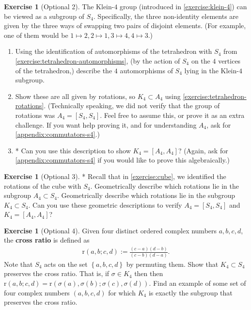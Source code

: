 \documentclass[reqno, 12pt, letter]{article}
\theoremstyle{plain}
\theoremstyle{definition}
\newtheorem{exercise}[theorem]{Exercise}
\theoremstyle{remark}
\numberwithin{equation}{section}
\begin{document}
\begin{exercise}[Optional 2]
	\label{exercise:}
	The Klein-$4$ group (introduced in \autoref{exercise:klein-4})
	can be viewed as a subgroup of $S_4$. Specifically, the three non-identity elements are
	given by the three ways of swapping two pairs of disjoint elements. (For example, one of them would be $1 \mapsto 2, 2 \mapsto 1, 3\mapsto 4, 4 \mapsto 3$.)
	\begin{enumerate}
		\item Using the identification of automorphisms of the tetrahedron with $S_4$ from \autoref{exercise:tetrahedron-automorphisms},
	(by the action of
	$S_4$ on the $4$ vertices of the tetrahedron,) 
	describe the $4$ automorphisms of $S_4$ lying in the Klein-$4$ subgroup. 
\item Show these are all given by rotations, so $K_4 \subset A_4$ using \autoref{exercise:tetrahedron-rotations}. (Technically speaking, we did
	not verify that the group of rotations was $A_4 = \left[ S_4, S_4 \right]$. Feel free to assume this, or prove it as an extra challenge.
	If you want help proving it, and for understanding $A_4$, ask for \autoref{appendix:commutators-s4}.)
\item* 	Can you use this description to show $K_4 = \left[ A_4, A_4 \right]$? (Again, ask for \autoref{appendix:commutators-s4} if you would like to
prove this algebraically.)
	\end{enumerate}
\end{exercise}

\begin{exercise}[Optional 3]*
	\label{exercise:}
	Recall that in \autoref{exercise:cube}, we identified the rotations of the cube with $S_4$.
	Geometrically describe which rotations lie in the subgroup $A_4 \subset S_4$.
	Geometrically describe which rotations lie in the subgroup $K_4 \subset S_4$.
	Can you use these geometric descriptions to verify $A_4 = \left[ S_4, S_4 \right]$ and $K_4 = \left[ A_4, A_4 \right]$?
\end{exercise}
\begin{exercise}[Optional 4]
	\label{exercise:}
	Given four distinct ordered complex numbers $a,b,c,d$, the {\bf cross ratio} is defined as
	\begin{align*}
		\mathrm{r}(a,b;c,d) := \frac{(c-a)(d-b)}{(c-b)(d-a)}.
	\end{align*}
Note that $S_4$ acts on the set $\left\{ a,b,c,d \right\}$ by permuting them. Show that $K_4 \subset S_4$ preserves the cross ratio.
	That is, if $\sigma \in K_4$ then then $\mathrm{r}(a,b;c,d) = \mathrm{r}(\sigma(a),\sigma(b);\sigma(c),\sigma(d))$.
	Find an example of some set of four complex numbers $(a,b,c,d)$ for which $K_4$ is exactly the subgroup that preserves
	the cross ratio.
\end{exercise}
\end{document}
